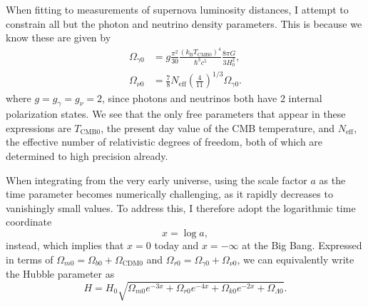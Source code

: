 \documentclass{aa}
\begin{document}
When fitting to measurements of supernova luminosity distances, I attempt to constrain all but the photon and neutrino density parameters. This is because we know these are given by
\begin{align}
    \Omega_{\gamma0} &= g\frac{\pi^2}{30}\frac{\left(k_\text{B}T_{\text{CMB}0}\right)^4}{\hbar^3c^5}\frac{8\pi G}{3H_0^2},
    \\
    \Omega_{\nu0} &= \frac{7}{8}N_\text{eff}\left(\frac{4}{11}\right)^{1/3}\Omega_{\gamma0}.
\end{align}
where $g=g_\gamma=g_\nu=2$, since photons and neutrinos both have 2 internal polarization states. We see that the only free parameters that appear in these expressions are $T_{\text{CMB}0}$, the present day value of the CMB temperature, and $N_\text{eff}$, the effective number of relativistic degrees of freedom, both of which are determined to high precision already. 

When integrating from the very early universe, using the scale factor $a$ as the time parameter becomes numerically challenging, as it rapidly decreases to vanishingly small values. To address this, I therefore adopt the logarithmic time coordinate
\begin{equation}
    x = \log a,
\end{equation}
instead, which implies that $x=0$ today and $x=-\infty$ at the Big Bang. Expressed in terms of $\Omega_{m0}=\Omega_{b0}+\Omega_{\text{CDM}0}$ and $\Omega_{r0}=\Omega_{\gamma0}+\Omega_{\nu0}$, we can equivalently write the Hubble parameter as
\begin{equation}
    H = H_0 \sqrt{\Omega_{m0} e^{-3x} + \Omega_{r0} e^{-4x} + \Omega_{k0} e^{-2x} + \Omega_{\Lambda 0}}.
\end{equation}
\end{document}
